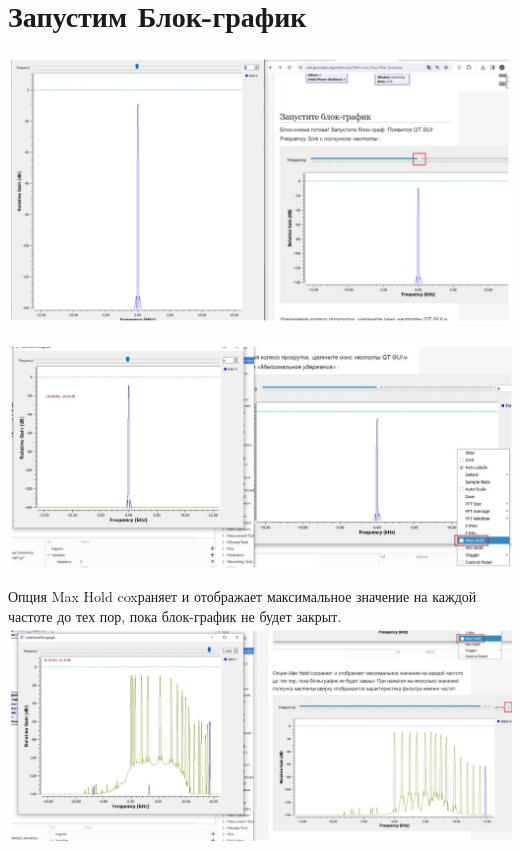 \documentclass[10pt]{article}
\begin{document}
\section*{Запустим Блок-график}
\begin{center}
\includegraphics[max width=\textwidth]{launch}
\end{center}

\begin{center}
\includegraphics[max width=\textwidth]{max}
\end{center}

Опция Max Hold coxраняет и отображает максимальное значение на каждой частоте до тех пор, пока блок-график не будет закрыт.\\
\includegraphics[max width=\textwidth, center]{save}
\end{document}

